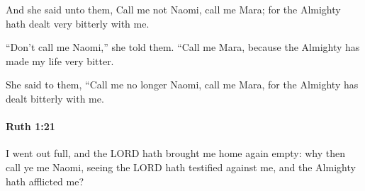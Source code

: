 			\begin{versebox}
					\item[BHS] 
					\item[LXX] 
					\item[ASV] And she said unto them, Call me not Naomi, call me Mara; for the Almighty hath dealt very bitterly with me.
					\item[NIV] “Don’t call me Naomi,” she told them. “Call me Mara, because the Almighty has made my life very bitter.
					\item[NRSV] She said to them, “Call me no longer Naomi, call me Mara, for the Almighty has dealt bitterly with me.
			\end{versebox}

		\paragraph{Ruth 1:21} %
			\label{RUTH-1-21}

			I went out full, and the LORD hath brought me home again empty: why then call ye me Naomi, seeing the LORD hath testified against me, and the Almighty hath afflicted me?

